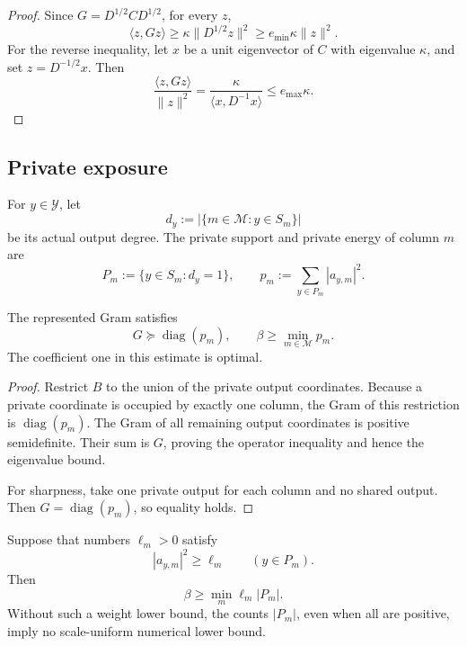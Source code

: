 \begin{proof}
Since \(G=D^{1/2}CD^{1/2}\), for every \(z\),
\[
 \langle z,Gz\rangle
 \ge\kappa\|D^{1/2}z\|^2
 \ge e_{\min}\kappa\|z\|^2.
\]
For the reverse inequality, let \(x\) be a unit eigenvector of \(C\)
with eigenvalue \(\kappa\), and set \(z=D^{-1/2}x\).  Then
\[
 \frac{\langle z,Gz\rangle}{\|z\|^2}
 =
 \frac{\kappa}{\langle x,D^{-1}x\rangle}
 \le e_{\max}\kappa.
\]
\end{proof}

\subsection{Private exposure}

For \(y\in\mathcal Y\), let
\[
 d_y:=|\{m\in\mathcal M:y\in S_m\}|
\]
be its actual output degree.  The private support and private energy of
column \(m\) are
\begin{equation}
 P_m:=\{y\in S_m:d_y=1\},
 \qquad
 p_m:=\sum_{y\in P_m}|a_{y,m}|^2.
 \label{eq:tpc66-private-exposure}
\end{equation}

\begin{theorem}
\label{thm:tpc66-private-exposure}
The represented Gram satisfies
\begin{equation}
 \boxed{
 G\succeq\operatorname{diag}(p_m),
 \qquad
 \beta\ge\min_{m\in\mathcal M}p_m.}
 \label{eq:tpc66-private-exposure-bound}
\end{equation}
The coefficient one in this estimate is optimal.
\end{theorem}

\begin{proof}
Restrict \(B\) to the union of the private output coordinates.  Because a
private coordinate is occupied by exactly one column, the Gram of this
restriction is \(\operatorname{diag}(p_m)\).  The Gram of all remaining
output coordinates is positive semidefinite.  Their sum is \(G\), proving
the operator inequality and hence the eigenvalue bound.

For sharpness, take one private output for each column and no shared output.
Then \(G=\operatorname{diag}(p_m)\), so equality holds.
\end{proof}

\begin{corollary}
\label{cor:tpc66-private-counts}
Suppose that numbers \(\ell_m>0\) satisfy
\[
 |a_{y,m}|^2\ge\ell_m
 \qquad(y\in P_m).
\]
Then
\begin{equation}
 \beta\ge\min_m\ell_m|P_m|.
 \label{eq:tpc66-private-count-bound}
\end{equation}
Without such a weight lower bound, the counts \(|P_m|\), even when all are
positive, imply no scale-uniform numerical lower bound.
\end{corollary}

